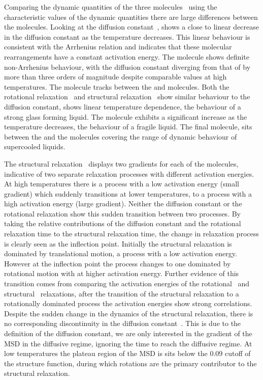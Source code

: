 Comparing the dynamic quantities of the three molecules~ using the characteristic values of the dynamic quantities there are large differences between the molecules. Looking at the diffusion constant~, \done shows a close to linear decrease in the diffusion constant as the temperature decreases. This linear behaviour is consistent with the Arrhenius relation and indicates that these molecular rearrangements have a constant activation energy. The \dcon molecule shows definite non-Arrhenius behaviour, with the diffusion constant diverging from that of \done by more than three orders of magnitude despite comparable values at high temperatures. The \tri molecule tracks between the \done and \dcon molecules. Both the rotational relaxation~ and structural relaxation~ show similar behaviour to the diffusion constant, \done shows linear temperature dependence, the behaviour of a strong glass forming liquid. The \dcon molecule exhibits a significant increase as the temperature decreases, the behaviour of a fragile liquid. The final molecule, \tri sits between the \done and the \dcon molecules covering the range of dynamic behaviour of supercooled liquids.

The structural relaxation~ displays two gradients for each of the molecules, indicative of two separate relaxation processes with different activation energies. At high temperatures there is a process with a low activation energy (small gradient) which suddenly transitions at lower temperatures, to a process with a high activation energy (large gradient). Neither the diffusion constant or the rotational relaxation show this sudden transition between two processes. By taking the relative contributions of the diffusion constant and the rotational relaxation time to the structural relaxation time, the change in relaxation process is clearly seen as the inflection point. Initially the structural relaxation is dominated by translational motion, a process with a low activation energy. However at the inflection point the process changes to one dominated by rotational motion with at higher activation energy. Further evidence of this transition comes from comparing the activation energies of the rotational~ and structural~ relaxations, after the transition of the structural relaxation to a rotationally dominated process the activation energies show strong correlations. Despite the sudden change in the dynamics of the structural relaxation, there is no corresponding discontinuity in the diffusion constant~. This is due to the definition of the diffusion constant, we are only interested in the gradient of the MSD in the diffusive regime, ignoring the time to reach the diffusive regime. At low temperatures the plateau region of the MSD is sits below the 0.09 cutoff of the structure function, during which rotations are the primary contributor to the structural relaxation. 

